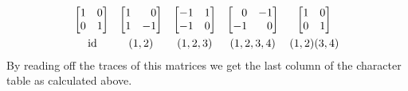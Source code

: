\begin{example}
  \[
    \begin{array}{ccccc}
        \begin{bmatrix*}[r]
          1 & 0 \\
          0 & 1
        \end{bmatrix*}
      & \begin{bmatrix*}[r]
          1 &  0  \\
          1 & -1
        \end{bmatrix*}
      & \begin{bmatrix*}[r]
          -1  & 1 \\
          -1  & 0
        \end{bmatrix*}
      & \begin{bmatrix*}[r]
           0  & -1 \\
          -1  &  0
        \end{bmatrix*}
      & \begin{bmatrix*}[r]
          1 & 0 \\
          0 & 1
        \end{bmatrix*}
      \\
        \rule{0pt}{1.2em}
        \id
      & (1,2)
      & (1,2,3)
      & (1,2,3,4)
      & (1,2)(3,4)
    \end{array}
  \]
  By reading off the traces of this matrices we get the last column of the character table as calculated above.
\end{example}


